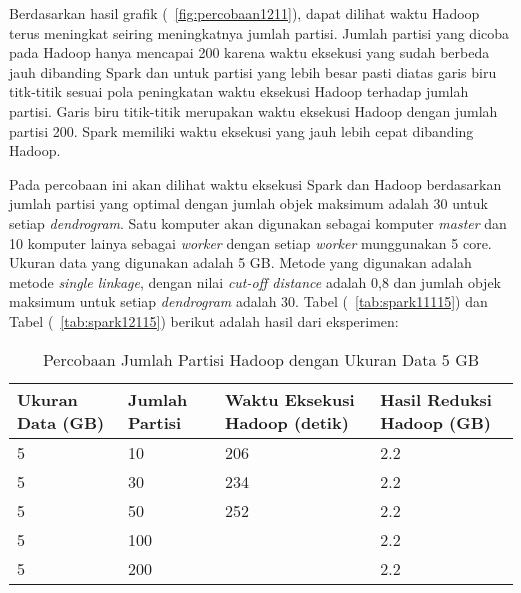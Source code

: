 Berdasarkan hasil grafik (~\ref{fig:percobaan1211}), dapat dilihat waktu Hadoop terus meningkat seiring meningkatnya jumlah partisi. Jumlah partisi yang dicoba pada Hadoop hanya mencapai 200 karena waktu eksekusi yang sudah berbeda jauh dibanding Spark dan untuk partisi yang lebih besar pasti diatas garis biru titk-titik sesuai pola peningkatan waktu eksekusi Hadoop terhadap jumlah partisi. Garis biru titik-titik merupakan waktu eksekusi Hadoop dengan jumlah partisi 200. Spark memiliki waktu eksekusi yang jauh lebih cepat dibanding Hadoop. 
















Pada percobaan ini akan dilihat waktu eksekusi Spark dan Hadoop berdasarkan jumlah partisi yang optimal dengan jumlah objek maksimum adalah 30 untuk setiap \textit{dendrogram}. Satu komputer akan digunakan sebagai komputer \textit{master} dan 10 komputer lainya sebagai \textit{worker} dengan setiap \textit{worker} munggunakan 5 core. Ukuran data yang digunakan adalah 5 GB. Metode yang digunakan adalah metode \textit{single linkage}, dengan nilai \textit{cut-off distance} adalah 0,8 dan jumlah objek maksimum untuk setiap \textit{dendrogram} adalah 30. Tabel (~\ref{tab:spark11115}) dan Tabel (~\ref{tab:spark12115}) berikut adalah hasil dari eksperimen:





\begin{table}[H] 
	\centering 
	\caption{Percobaan Jumlah Partisi Hadoop dengan Ukuran Data 5 GB}
	\label{tab:spark1111}
	\begin{tabular}{|p{3cm}|p{3cm}|p{4cm}|p{4cm}|}
\hline
Ukuran Data (GB) & Jumlah Partisi &  Waktu Eksekusi Hadoop (detik) & Hasil Reduksi Hadoop (GB)\\
\hline
5 & 10 & 206  & 2.2  \\
\hline
5 & 30 & 234  & 2.2  \\
\hline
5 & 50 & 252  & 2.2   \\
\hline
5 & 100 &   & 2.2   \\
\hline
5 & 200 &   & 2.2   \\
\hline


\hline

	\end{tabular} 
\end{table}







